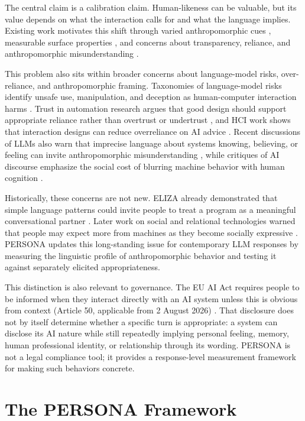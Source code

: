 \documentclass[manuscript,review,anonymous]{acmart}
\begin{document}
The central claim is a calibration claim. Human-likeness can be valuable, but its value depends on what the interaction calls for and what the language implies. Existing work motivates this shift through varied anthropomorphic cues \cite{devrio2025}, measurable surface properties \cite{cheng2025}, and concerns about transparency, reliance, and anthropomorphic misunderstanding \cite{abercrombie2023,leong2019,sharkey2021}.

This problem also sits within broader concerns about language-model risks, over-reliance, and anthropomorphic framing. Taxonomies of language-model risks identify unsafe use, manipulation, and deception as human-computer interaction harms \cite{Weidinger2022Risks}. Trust in automation research argues that good design should support appropriate reliance rather than overtrust or undertrust \cite{lee2004}, and HCI work shows that interaction designs can reduce overreliance on AI advice \cite{Bucinca2021CognitiveForcing}. Recent discussions of LLMs also warn that imprecise language about systems knowing, believing, or feeling can invite anthropomorphic misunderstanding \cite{Shanahan2024Talking}, while critiques of AI discourse emphasize the social cost of blurring machine behavior with human cognition \cite{bender2024}.

Historically, these concerns are not new. ELIZA already demonstrated that simple language patterns could invite people to treat a program as a meaningful conversational partner \cite{weizenbaum1966}. Later work on social and relational technologies warned that people may expect more from machines as they become socially expressive \cite{turkle2011}. PERSONA updates this long-standing issue for contemporary LLM responses by measuring the linguistic profile of anthropomorphic behavior and testing it against separately elicited appropriateness.

This distinction is also relevant to governance. The EU AI Act requires people to be informed when they interact directly with an AI system unless this is obvious from context (Article 50, applicable from 2 August 2026) \cite{EUAIAct2024}. That disclosure does not by itself determine whether a specific turn is appropriate: a system can disclose its AI nature while still repeatedly implying personal feeling, memory, human professional identity, or relationship through its wording. PERSONA is not a legal compliance tool; it provides a response-level measurement framework for making such behaviors concrete.

\section{The PERSONA Framework}
\end{document}
